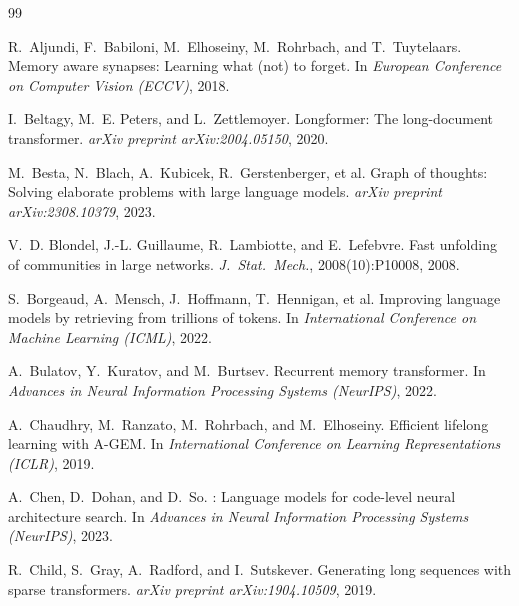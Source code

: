 \documentclass[conference]{IEEEtran}
\begin{document}

\begin{thebibliography}{99}

R.~Aljundi, F.~Babiloni, M.~Elhoseiny, M.~Rohrbach, and T.~Tuytelaars.
\newblock Memory aware synapses: Learning what (not) to forget.
\newblock In \emph{European Conference on Computer Vision (ECCV)}, 2018.

I.~Beltagy, M.~E. Peters, and L.~Zettlemoyer.
\newblock Longformer: The long-document transformer.
\newblock \emph{arXiv preprint arXiv:2004.05150}, 2020.

M.~Besta, N.~Blach, A.~Kubicek, R.~Gerstenberger, et al.
\newblock Graph of thoughts: Solving elaborate problems with large language models.
\newblock \emph{arXiv preprint arXiv:2308.10379}, 2023.

V.~D. Blondel, J.-L. Guillaume, R.~Lambiotte, and E.~Lefebvre.
\newblock Fast unfolding of communities in large networks.
\newblock \emph{J.\ Stat.\ Mech.}, 2008(10):P10008, 2008.

S.~Borgeaud, A.~Mensch, J.~Hoffmann, T.~Hennigan, et al.
\newblock Improving language models by retrieving from trillions of tokens.
\newblock In \emph{International Conference on Machine Learning (ICML)}, 2022.

A.~Bulatov, Y.~Kuratov, and M.~Burtsev.
\newblock Recurrent memory transformer.
\newblock In \emph{Advances in Neural Information Processing Systems (NeurIPS)}, 2022.

A.~Chaudhry, M.~Ranzato, M.~Rohrbach, and M.~Elhoseiny.
\newblock Efficient lifelong learning with A-GEM.
\newblock In \emph{International Conference on Learning Representations (ICLR)}, 2019.

A.~Chen, D.~Dohan, and D.~So.
: Language models for code-level neural architecture search.
\newblock In \emph{Advances in Neural Information Processing Systems (NeurIPS)}, 2023.

R.~Child, S.~Gray, A.~Radford, and I.~Sutskever.
\newblock Generating long sequences with sparse transformers.
\newblock \emph{arXiv preprint arXiv:1904.10509}, 2019.


\end{thebibliography}
\end{document}
